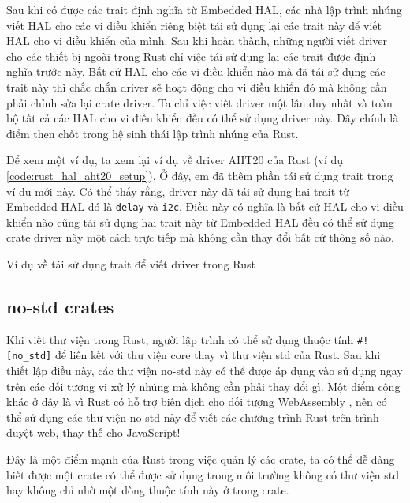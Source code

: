 Sau khi có được các trait định nghĩa từ Embedded HAL, các nhà lập trình nhúng viết HAL cho các vi điều khiển riêng biệt tái sử dụng lại các trait này để viết HAL cho vi điều khiển của mình.
Sau khi hoàn thành, những người viết driver cho các thiết bị ngoài trong Rust chỉ việc tái sử dụng lại các trait được định nghĩa trước này.
Bất cứ HAL cho các vi điều khiển nào mà đã tái sử dụng các trait này thì chắc chắn driver sẽ hoạt động cho vi điều khiển đó mà không cần phải chỉnh sửa lại crate driver.
Ta chỉ việc viết driver một lần duy nhất và toàn bộ tất cả các HAL cho vi điều khiển đều có thể sử dụng driver này.
Đây chính là điểm then chốt trong hệ sinh thái lập trình nhúng của Rust.

Để xem một ví dụ, ta xem lại ví dụ về driver AHT20 của Rust (ví dụ \ref{code:rust_hal_aht20_setup}).
Ở đây, em đã thêm phần tái sử dụng trait trong ví dụ mới này.
Có thể thấy rằng, driver này đã tái sử dụng hai trait từ Embedded HAL đó là \texttt{delay} và \texttt{i2c}.
Điều này có nghĩa là bất cứ HAL cho vi điều khiển nào cũng tái sử dụng hai trait này từ Embedded HAL đều có thể sử dụng crate driver này một cách trực tiếp mà không cần thay đổi bất cứ thông số nào.
\begin{listing}[ht]
\begin{rustcode}
use embedded_hal::blocking::{delay::DelayMs, i2c::{Write, WriteRead}};
pub fn new(i2c: I2C, delay: D) -> Result<Self, Error<E>> {
\end{rustcode}
\caption{Ví dụ về tái sử dụng trait để viết driver trong Rust}
\end{listing}

\subsection{no-std crates}\label{lbl:no_std_crates}
Khi viết thư viện trong Rust, người lập trình có thể sử dụng thuộc tính \texttt{#![no_std]} để liên kết với thư viện core thay vì thư viện std của Rust.
Sau khi thiết lập điều này, các thư viện no-std này có thể được áp dụng vào sử dụng ngay trên các đối tượng vi xử lý nhúng mà không cần phải thay đổi gì.
Một điểm cộng khác ở đây là vì Rust có hỗ trợ biên dịch cho đối tượng WebAssembly \cite{rustc_book}, nên có thể sử dụng các thư viện no-std này để viết các chương trình Rust trên trình duyệt web, thay thế cho JavaScript! \cite{hoffman2019programming, wasm_book}

Đây là một điểm mạnh của Rust trong việc quản lý các crate, ta có thể dễ dàng biết được một crate có thể được sử dụng trong môi trường không có thư viện std hay không chỉ nhờ một dòng thuộc tính này ở trong crate.


